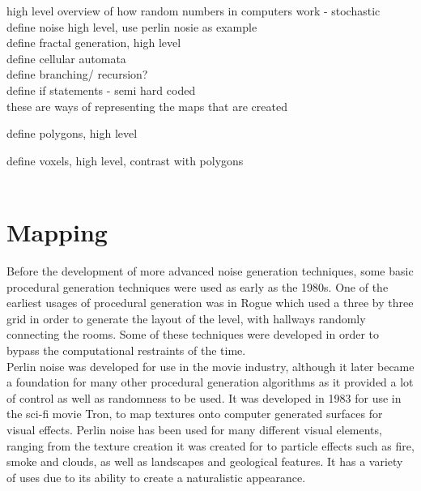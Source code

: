 \documentclass[12pt]{report}
\begin{document}
		high level overview of how random numbers in computers work - stochastic\\
		
		\noindent define noise high level, use perlin nosie as example\\
		
		\noindent define fractal generation, high level\\
		
		\noindent define cellular automata\\
		
		\noindent define branching/ recursion?\\
		
		\noindent define if statements - semi hard coded\\
		
		
		
		
		\noindent these are ways of representing the maps that are created
		
		\noindent define polygons, high level
		
		\noindent define voxels, high level, contrast with polygons\\
		\\
	
	\let\clearpage\relax
	\chapter{Mapping}
		Before the development of more advanced noise generation techniques, some basic procedural generation techniques were used as early as the 1980s. One of the earliest usages of procedural generation was in Rogue
		which used a three by three grid in order to generate the layout of the level, with hallways randomly connecting the rooms. Some of these techniques were developed in order to bypass the computational restraints of the time. \\
		
		\noindent Perlin noise was developed for use in the movie industry, although it later became a foundation for many other procedural generation algorithms as it provided a lot of control as well as randomness to be used. It was developed in 1983 for use in the sci-fi movie Tron, to map textures onto computer generated surfaces for visual effects. Perlin noise has been used for many different visual elements, ranging from the texture creation it was created for to particle effects such as fire, smoke and clouds, as well as landscapes and geological features. It has a variety of uses due to its ability to create a naturalistic appearance. \\
		\\
		
\end{document}
